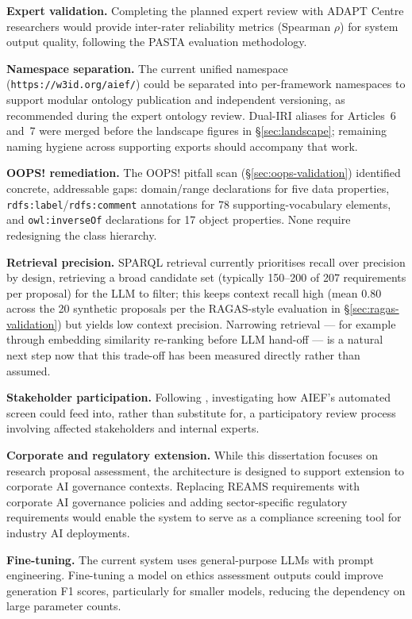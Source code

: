 \textbf{Expert validation.} Completing the planned expert review with ADAPT Centre researchers would provide inter-rater reliability metrics (Spearman $\rho$) for system output quality, following the PASTA \cite{pasta2026} evaluation methodology.

\textbf{Namespace separation.} The current unified namespace (\texttt{https://w3id.org/aief/}) could be separated into per-framework namespaces to support modular ontology publication and independent versioning, as recommended during the expert ontology review. Dual-IRI aliases for Articles~6 and~7 were merged before the landscape figures in \S\ref{sec:landscape}; remaining naming hygiene across supporting exports should accompany that work.

\textbf{OOPS! remediation.} The OOPS! pitfall scan (\S\ref{sec:oops-validation}) identified concrete, addressable gaps: domain/range declarations for five data properties, \texttt{rdfs:label}/\texttt{rdfs:comment} annotations for 78 supporting-vocabulary elements, and \texttt{owl:inverseOf} declarations for 17 object properties. None require redesigning the class hierarchy.

\textbf{Retrieval precision.} SPARQL retrieval currently prioritises recall over precision by design, retrieving a broad candidate set (typically 150--200 of 207 requirements per proposal) for the LLM to filter; this keeps context recall high (mean 0.80 across the 20 synthetic proposals per the RAGAS-style evaluation in \S\ref{sec:ragas-validation}) but yields low context precision. Narrowing retrieval — for example through embedding similarity re-ranking before LLM hand-off — is a natural next step now that this trade-off has been measured directly rather than assumed.

\textbf{Stakeholder participation.} Following \cite{jarvers2026engaged,ullstein2026pafria}, investigating how AIEF's automated screen could feed into, rather than substitute for, a participatory review process involving affected stakeholders and internal experts.

\textbf{Corporate and regulatory extension.} While this dissertation focuses on research proposal assessment, the architecture is designed to support extension to corporate AI governance contexts. Replacing REAMS requirements with corporate AI governance policies and adding sector-specific regulatory requirements would enable the system to serve as a compliance screening tool for industry AI deployments.

\textbf{Fine-tuning.} The current system uses general-purpose LLMs with prompt engineering. Fine-tuning a model on ethics assessment outputs could improve generation F1 scores, particularly for smaller models, reducing the dependency on large parameter counts.

